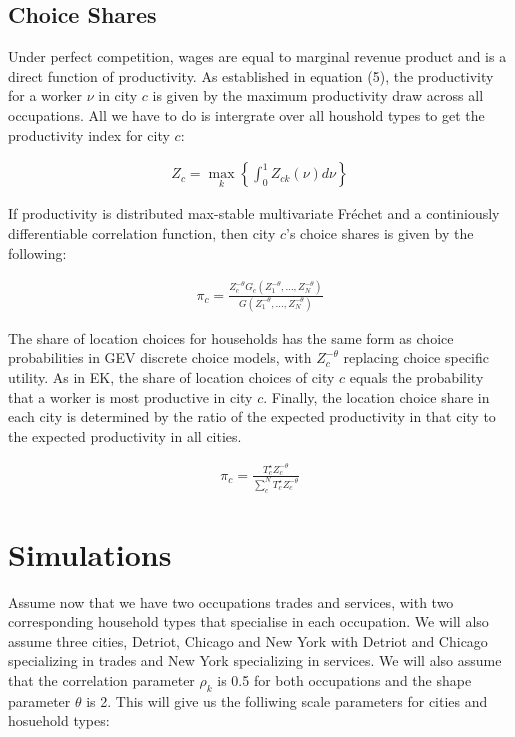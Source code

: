 \documentclass[10pt]{article}
\begin{document}
\subsection{Choice Shares}

Under perfect competition, wages are equal to marginal revenue product and is a direct function of productivity. As established in equation (5), the productivity for a worker $\nu$ in city $c$ is given by the maximum productivity draw across all occupations. All we have to do is intergrate over all houshold types to get the productivity index for city $c$:

\begin{align}
    Z_c = \max_k \left\{ \int_{0}^{1} Z_{ck} (\nu) d\nu \right\}
\end{align}

If productivity is distributed max-stable multivariate Fréchet and a continiously differentiable correlation function, then city $c$'s choice shares is given by the following:

\begin{align}
    \pi_c = \frac{Z_c^{-\theta} G_c(Z_1^{-\theta}, \dots, Z_N^{-\theta})}{G(Z_1^{-\theta}, \dots, Z_N^{-\theta})}
\end{align}

The share of location choices for households has the same form as choice probabilities in GEV discrete choice models, with $Z_c^{-\theta}$ replacing choice specific utility. As in EK, the share of location choices of city $c$ equals the probability that a worker is most productive in city $c$. Finally, the location choice share in each city is determined by the ratio of the expected productivity in that city to the expected productivity in all cities.

\begin{align}
    \pi_c = \frac{T_c^{\star} Z_c^{-\theta}}{\sum_{c}^{N} T_c^{\star} Z_c^{-\theta}}
\end{align}

\section{Simulations}

Assume now that we have two occupations trades and services, with two corresponding household types that specialise in each occupation. We will also assume three cities, Detriot, Chicago and New York with Detriot and Chicago specializing in trades and New York specializing in services. We will also assume that the correlation parameter $\rho_k$ is 0.5 for both occupations and the shape parameter $\theta$ is 2. This will give us the folliwing scale parameters for cities and hosuehold types:
\end{document}
